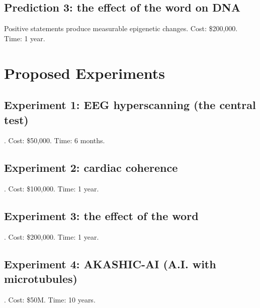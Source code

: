 \subsection{Prediction 3: the effect of the word on DNA}
Positive statements produce measurable epigenetic changes. Cost: \$200,000. Time: 1 year.

\section{Proposed Experiments}
\subsection{Experiment 1: EEG hyperscanning (the central test)}. Cost: \$50,000. Time: 6 months.
\subsection{Experiment 2: cardiac coherence}. Cost: \$100,000. Time: 1 year.
\subsection{Experiment 3: the effect of the word}. Cost: \$200,000. Time: 1 year.
\subsection{Experiment 4: AKASHIC-AI (A.I. with microtubules)}. Cost: \$50M. Time: 10 years.


